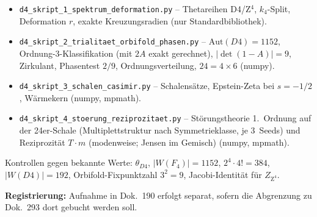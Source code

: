 \begin{itemize}
  \item \texttt{d4\_skript\_1\_spektrum\_deformation.py} --
        Thetareihen D4/Z$^4$, $k_4$-Split, Deformation $r$, exakte
        Kreuzungsradien (nur Standardbibliothek).
  \item \texttt{d4\_skript\_2\_trialitaet\_orbifold\_phasen.py} --
        $\text{Aut}(D4) = 1152$, Ordnung-3-Klassifikation (mit $2A$
        exakt gerechnet), $|\det(1-A)| = 9$, Zirkulant, Phasentest
        $2/9$, Ordnungsverteilung, $24 = 4\times6$ (numpy).
  \item \texttt{d4\_skript\_3\_schalen\_casimir.py} --
        Schalensätze, Epstein-Zeta bei $s = -1/2$, Wärmekern
        (numpy, mpmath).
  \item \texttt{d4\_skript\_4\_stoerung\_reziprozitaet.py} --
        Störungstheorie 1.~Ordnung auf der 24er-Schale
        (Multiplettstruktur nach Symmetrieklasse, je 3~Seeds) und
        Reziprozität $T\cdot m$ (modenweise; Jensen im Gemisch)
        (numpy, mpmath).
\end{itemize}

Kontrollen gegen bekannte Werte: $\theta_{D4}$,
$|W(F_4)| = 1152$, $2^4\cdot4! = 384$, $|W(D4)| = 192$,
Orbifold-Fixpunktzahl $3^2 = 9$, Jacobi-Identität für
$Z_{\text{Z}^4}$.

\medskip
\noindent\textbf{Registrierung:} Aufnahme in Dok.~190 erfolgt
separat, sofern die Abgrenzung zu Dok.~293 dort gebucht werden soll.


